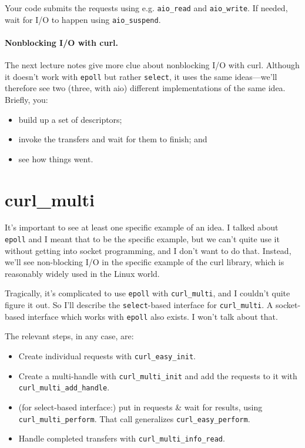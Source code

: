 Your code submits the requests using e.g. {\tt aio\_read} and {\tt aio\_write}.
If needed, wait for I/O to happen using {\tt aio\_suspend}.

\paragraph{Nonblocking I/O with curl.} The next lecture notes give more clue
about nonblocking I/O with curl. Although it doesn't work with {\tt epoll}
but rather {\tt select}, it uses the same ideas---we'll therefore see two
(three, with aio) different implementations of the same idea. 
Briefly, you:
\begin{itemize}
\item build up a set of descriptors;
\item invoke the transfers and wait for them to finish; and
\item see how things went.
\end{itemize}

\section*{curl\_multi}
It's important to see at least one specific example of an idea. I talked about
{\tt epoll} and I meant that to be the specific example, but we 
can't quite use it without getting into socket programming, and I don't want to
do that. Instead, we'll see non-blocking I/O in the specific example of the curl
library, which is reasonably widely used in the Linux world.

Tragically, it's complicated to use {\tt epoll} with {\tt curl\_multi}, and I couldn't
quite figure it out. So I'll describe the {\tt select}-based interface for {\tt curl\_multi}.
A socket-based interface which works with {\tt epoll} also exists. I won't talk about that.

The relevant steps, in any case, are:
\begin{itemize}
\item Create individual requests with {\tt curl\_easy\_init}.
\item Create a multi-handle with {\tt curl\_multi\_init} and add the requests to it
with {\tt curl\_multi\_add\_handle}.
\item (for select-based interface:) put in requests \& wait for results, using {\tt 
curl\_multi\_perform}. That call generalizes {\tt curl\_easy\_perform}.
\item Handle completed transfers with {\tt curl\_multi\_info\_read}.
\end{itemize}

